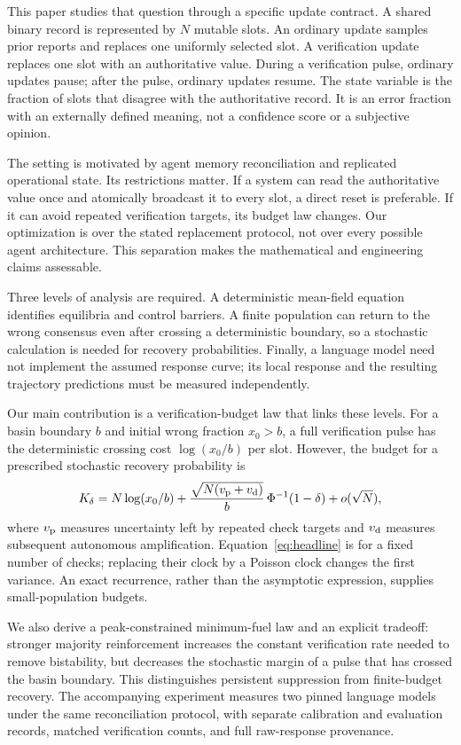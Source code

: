 \documentclass[11pt]{article}
\theoremstyle{remark}\newtheorem{remark}[theorem]{Remark}
\begin{document}
This paper studies that question through a specific update contract. A shared binary record is represented by $N$ mutable slots. An ordinary update samples prior reports and replaces one uniformly selected slot. A verification update replaces one slot with an authoritative value. During a verification pulse, ordinary updates pause; after the pulse, ordinary updates resume. The state variable is the fraction of slots that disagree with the authoritative record. It is an error fraction with an externally defined meaning, not a confidence score or a subjective opinion.

The setting is motivated by agent memory reconciliation and replicated operational state. Its restrictions matter. If a system can read the authoritative value once and atomically broadcast it to every slot, a direct reset is preferable. If it can avoid repeated verification targets, its budget law changes. Our optimization is over the stated replacement protocol, not over every possible agent architecture. This separation makes the mathematical and engineering claims assessable.

Three levels of analysis are required. A deterministic mean-field equation identifies equilibria and control barriers. A finite population can return to the wrong consensus even after crossing a deterministic boundary, so a stochastic calculation is needed for recovery probabilities. Finally, a language model need not implement the assumed response curve; its local response and the resulting trajectory predictions must be measured independently.

Our main contribution is a verification-budget law that links these levels. For a basin boundary $b$ and initial wrong fraction $x_0>b$, a full verification pulse has the deterministic crossing cost $\log(x_0/b)$ per slot. However, the budget for a prescribed stochastic recovery probability is
\begin{equation}
 K_\delta=N\log(x_0/b)+\frac{\sqrt{N(v_{\rm p}+v_{\rm d})}}{b}\,\Phi^{-1}(1-\delta)+o(\sqrt N),
 \label{eq:headline}
\end{equation}
where $v_{\rm p}$ measures uncertainty left by repeated check targets and $v_{\rm d}$ measures subsequent autonomous amplification. Equation~\eqref{eq:headline} is for a fixed number of checks; replacing their clock by a Poisson clock changes the first variance. An exact recurrence, rather than the asymptotic expression, supplies small-population budgets.

We also derive a peak-constrained minimum-fuel law and an explicit tradeoff: stronger majority reinforcement increases the constant verification rate needed to remove bistability, but decreases the stochastic margin of a pulse that has crossed the basin boundary. This distinguishes persistent suppression from finite-budget recovery. The accompanying experiment measures two pinned language models under the same reconciliation protocol, with separate calibration and evaluation records, matched verification counts, and full raw-response provenance.
\end{document}
